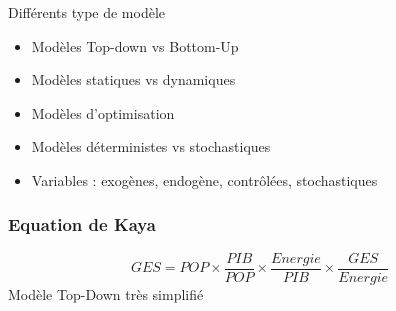 \documentclass{beamer}
\begin{document}
\begin{frame}{Différents type de modèle}
\begin{itemize}
 \item Modèles Top-down vs Bottom-Up
 \item Modèles statiques vs dynamiques
 \item Modèles d'optimisation
 \item Modèles déterministes vs stochastiques
 \item Variables : exogènes, endogène, contrôlées, stochastiques
\end{itemize}
\end{frame}



\begin{frame}
\frametitle{Equation de Kaya}
\begin{equation*}
GES=POP \times \frac{PIB}{POP} \times \frac{Energie}{PIB}\times \frac{GES}{Energie}
\end{equation*}
\pause
Modèle Top-Down très simplifié
\end{frame}
\end{document}
